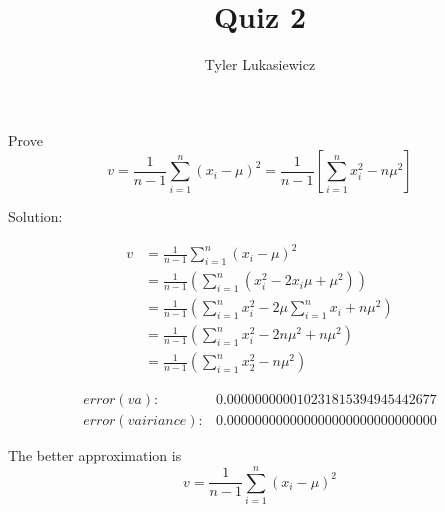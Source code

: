 \documentclass{article}
\title{Quiz 2}
\author{Tyler Lukasiewicz}
\begin{document}
\maketitle

Prove 
\begin{equation}
    v = \frac{1}{n-1} \sum_{i =1}^n (x_i - \mu)^2 = \frac{1}{n-1} \left[\sum_{i = 1}^n x_i ^2 -n \mu ^2\right]
\end{equation}

Solution:

\begin{align*}
    v &= \frac{1}{n-1} \sum_{i =1}^n (x_i - \mu)^2 \\
    &= \frac{1}{n-1}(\sum_{i=1}^n (x_i^2 - 2 x_i \mu  + \mu ^2)) \\
    &= \frac{1}{n-1} (\sum_{i=1}^n x_i^2 - 2 \mu \sum_{i=1}^n x_i + n \mu^2) \\
    &=  \frac{1}{n-1} (\sum_{i=1}^n x_i^2  - 2 n \mu ^2 + n \mu ^2) \\
    &= \frac{1}{n-1}(\sum_{i=1}^n x_2^2 - n \mu ^2)
\end{align*}

\begin{align*}
    error(va): &0.000000000010231815394945442677 \\
    error(vairiance): &0.000000000000000000000000000000
\end{align*}


The better approximation is
\begin{equation*}
     v = \frac{1}{n-1} \sum_{i =1}^n (x_i - \mu)^2 
\end{equation*}
\end{document}

